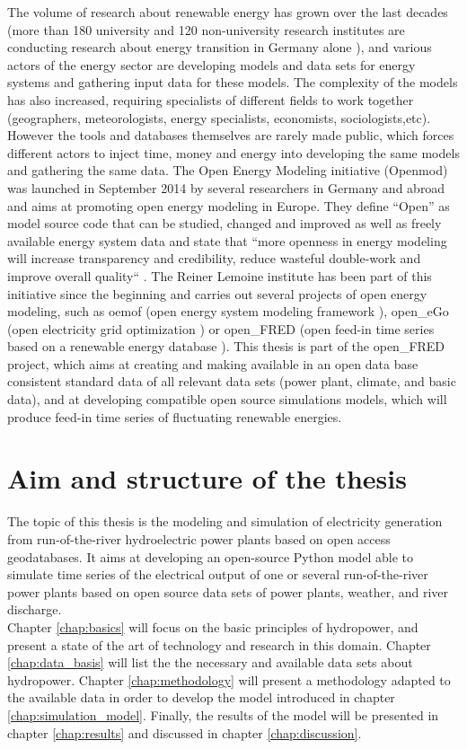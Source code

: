 The volume of research about renewable energy has grown over the last decades (more than 180 university and 120 non-university research institutes are conducting research about energy transition in Germany alone \cite{bmbf_energiewende}), and various actors of the energy sector are developing models and data sets for energy systems and gathering input data for these models. The complexity of the models has also increased, requiring specialists of different fields to work together (geographers, meteorologists, energy specialists, economists, sociologists,etc). However the tools and databases themselves are rarely made public, which forces different actors to inject time, money and energy into developing the same models and gathering the same data. \newline
The Open Energy Modeling initiative (Openmod) was launched in September 2014 by several researchers in Germany and abroad \cite{openmod_workshop} and aims at promoting open energy modeling in Europe. They define “Open” as model source code that can be studied, changed and improved as well as freely available energy system data and state that ``more openness in energy modeling will increase transparency and credibility, reduce wasteful double-work and improve overall quality`` \cite{openmod_manifesto}. \newline
The Reiner Lemoine institute has been part of this initiative since the beginning and  carries out several projects of open energy modeling, such as oemof (open energy system modeling framework \cite{rli_oemof}), open\_eGo (open electricity grid optimization \cite{rli_openego}) or open\_FRED (open feed-in time series based on a renewable energy database \cite{rli_openfred}). This thesis is part of the open\_FRED project, which aims at creating and making available in an open data base consistent standard data of all relevant data sets (power plant, climate, and basic data), and at developing compatible open source simulations models, which will produce feed-in time series of fluctuating renewable energies. \newline

\section{Aim and structure of the thesis}
The topic of this thesis is the modeling and simulation of electricity generation from run-of-the-river hydroelectric power plants based on open access geodatabases. It aims at developing an open-source Python model able to simulate time series of the electrical output of one or several run-of-the-river power plants based on open source data sets of power plants, weather, and river discharge. \\
Chapter \ref{chap:basics} will focus on the basic principles of hydropower, and present a state of the art of technology and research in this domain. Chapter \ref{chap:data_basis} will list the the necessary and available data sets about hydropower. Chapter \ref{chap:methodology} will present a methodology adapted to the available data in order to develop the model introduced in chapter \ref{chap:simulation_model}. Finally, the results of the model will be presented in chapter \ref{chap:results} and discussed in chapter \ref{chap:discussion}.


